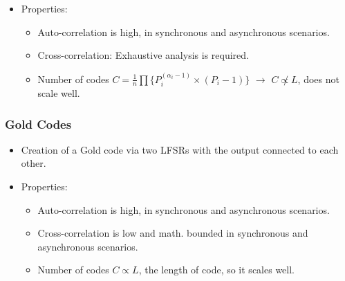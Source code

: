\documentclass{beamer}
\begin{document}
\begin{frame}
\begin{itemize}
\begin{figure}[t]
{
					}
				\end{figure}

			\item Properties:

			\begin{itemize}
				\item Auto-correlation is high, in synchronous and asynchronous scenarios.

				\item Cross-correlation: Exhaustive analysis is required.

				\item Number of codes $C = \frac{1}{n} \prod \{ P_{i} ^ {(\alpha_i - 1)} \times (P_i - 1) \}$ $\rightarrow$ $C \not\propto L$, does not scale well.
			\end{itemize}

		\end{itemize}
		

	\end{frame}



	\begin{frame}\frametitle{Gold Codes}

		\begin{itemize}
			\item Creation of a Gold code via two LFSRs with the output connected to each other.

			\item Properties:
			\begin{itemize}

				\item Auto-correlation is high, in synchronous and asynchronous scenarios.

				\item Cross-correlation is low and math. bounded in synchronous and asynchronous scenarios.

				\item Number of codes $C \propto L$, the length of code, so it scales well.

			\end{itemize}


		\end{itemize}
		

	\end{frame}
\end{document}
